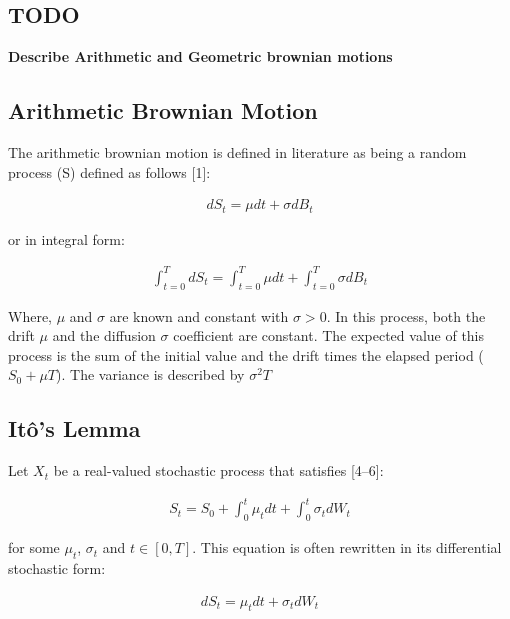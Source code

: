 \documentclass[12pt,twoside]{reedthesis}
\theoremstyle{definition}
\theoremstyle{definition}
\theoremstyle{remark}
\begin{document}
  \subsection{TODO}\label{todo}
  
  \textbf{Describe Arithmetic and Geometric brownian motions}
  
  \subsection{Arithmetic Brownian
  Motion}\label{arithmetic-brownian-motion}
  
  The arithmetic brownian motion is defined in literature as being a
  random process (S) defined as follows {[}1{]}:
  
  \begin{align}
  dS_t = \mu dt + \sigma dB_t
  \end{align}
  
  \center or in integral form:
  
  \begin{align}
  \int_{t=0}^{T} dS_t = \int_{t=0}^{T}{\mu dt} + \int_{t=0}^{T}{\sigma dB_t}
  \end{align}
  
  \noindent
  Where, \(\mu\) and \(\sigma\) are known and constant with
  \(\sigma > 0\). In this process, both the drift \(\mu\) and the
  diffusion \(\sigma\) coefficient are constant. The expected value of
  this process is the sum of the initial value and the drift times the
  elapsed period (\(S_0 + \mu T\)). The variance is described by
  \(\sigma^2 T\)
  
  \subsection{Itô's Lemma}\label{itos-lemma}
  
  Let \(X_{t}\) be a real-valued stochastic process that satisfies
  {[}4--6{]}:
  
  \begin{align}
  S_t = S_0 + \int_{0}^{t} \mu_t dt + \int_{0}^{t} \sigma_t dW_t
  \end{align}
  
  \noindent
  for some \(\mu_t\), \(\sigma_t\) and \(t \in [0,T]\). This equation is
  often rewritten in its differential stochastic form:
  
  \begin{align}
  dS_t = \mu_t dt + \sigma_t dW_t 
  \end{align}
  
\end{document}
